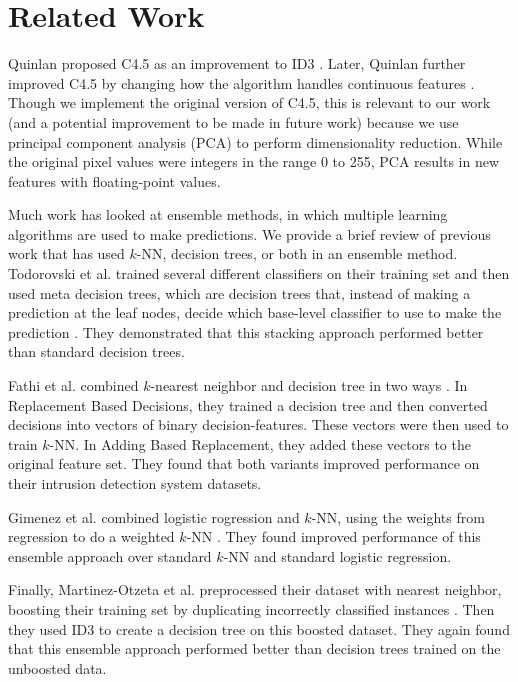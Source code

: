 \section{Related Work}
Quinlan proposed C4.5 as an improvement to ID3 \cite{quinlan2014c4}. Later, Quinlan further improved C4.5 by changing how the algorithm handles continuous features \cite{quinlan1996improved}. Though we implement the original version of C4.5, this is relevant to our work (and a potential improvement to be made in future work) because we use principal component analysis (PCA) to perform dimensionality reduction.  While the original pixel values were integers in the range 0 to 255, PCA results in new features with floating-point values.

Much work has looked at ensemble methods, in which multiple learning algorithms are used to make predictions. We provide a brief review of previous work that has used $k$-NN, decision trees, or both in an ensemble method. Todorovski et al. trained several different classifiers on their training set and then used meta decision trees, which are decision trees that, instead of making a prediction at the leaf nodes, decide which base-level classifier to use to make the prediction \cite{todorovski2003combining}. They demonstrated that this stacking approach performed better than standard decision trees.

Fathi et al. combined $k$-nearest neighbor and decision tree in two ways \cite{FathiMazinani}. In Replacement Based Decisions, they trained a decision tree and then converted decisions into vectors of binary decision-features. These vectors were then used to train $k$-NN. In Adding Based Replacement, they added these vectors to the original feature set. They found that both variants improved performance on their intrusion detection system datasets.

Gimenez et al. combined logistic rogression and $k$-NN, using the weights from regression to do a weighted $k$-NN \cite{campillo2013improving}. They found improved performance of this ensemble approach over standard $k$-NN and standard logistic regression. 

Finally, Martinez-Otzeta et al. preprocessed their dataset with nearest neighbor, boosting their training set by duplicating incorrectly classified instances \cite{martinezk}.  Then they used ID3 to create a decision tree on this boosted dataset. They again found that this ensemble approach performed better than decision trees trained on the unboosted data. 